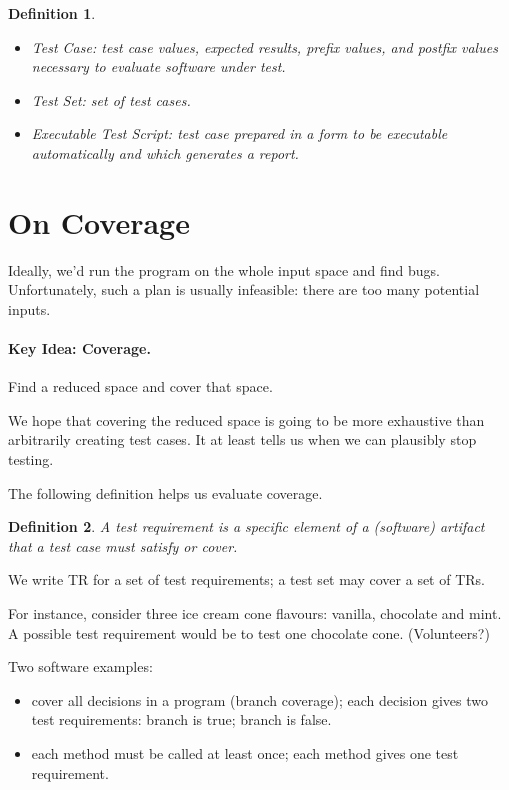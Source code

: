 \documentclass[11pt]{article}
\newtheorem{defn}{Definition}
\begin{document}
\begin{defn} ~\\[-2em]

\begin{itemize}
\item \emph{Test Case}: test case values, expected results, prefix values, and postfix values necessary to evaluate software under test.
\item \emph{Test Set}: set of test cases.
\item \emph{Executable Test Script}: test case prepared in a form to be executable automatically and which generates a report.
\end{itemize}
\end{defn}

\section*{On Coverage}
Ideally, we'd run the program on the whole input space and find bugs. 
Unfortunately, such a plan is usually infeasible: there are too many potential
inputs. 

\paragraph{Key Idea: Coverage.} Find a reduced space and cover that space. 

We hope that covering the reduced space is going to be more exhaustive than
arbitrarily creating test cases. It at least tells us when we can plausibly
stop testing.

The following definition helps us evaluate coverage.

\begin{defn}
A \emph{test requirement} is a specific element of a (software)
artifact that a test case must satisfy or cover.
\end{defn}
We write TR for a set of test requirements; a test set may cover a
set of TRs.

For instance, consider three ice cream cone flavours: vanilla,
chocolate and mint. A possible test requirement would be to test
one chocolate cone. (Volunteers?)

Two software examples:
\begin{itemize}
\item cover all decisions in a program (branch coverage); each decision 
gives two test requirements: branch is true; branch is false.
\item each method must be called at least once; each method gives one test
requirement.
\end{itemize}
\end{document}
